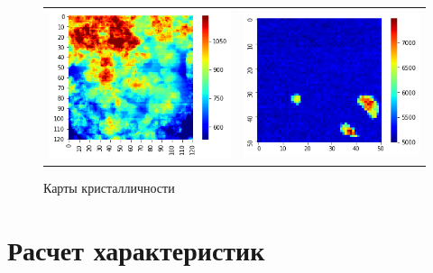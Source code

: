 		\begin{figure}[ht]\centering
\begin{tabular}{cc}
\includegraphics[width=0.5\linewidth]{fig/example72.png}
&
\includegraphics[width=0.5\linewidth]{fig/example1434.png} \\
\end{tabular}
\caption{Карты кристалличности}
\end{figure}
	
	
	
	
\section{Расчет характеристик}
